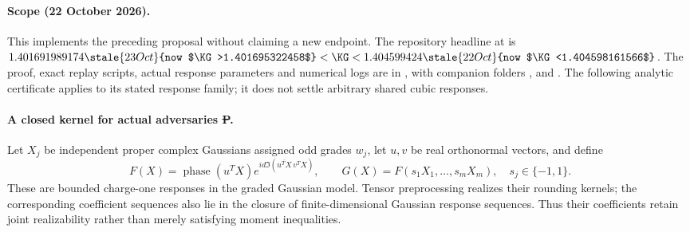\paragraph{Scope (22 October 2026).}
This implements the preceding proposal without claiming a new endpoint.
The repository headline at  is
$1.401691989174\stale{23 Oct}{now $\KG>1.401695322458$}<\KG<1.404599424\stale{22 Oct}{now $\KG<1.404598161566$}$.
The proof, exact replay scripts, actual response parameters and numerical
logs are in
,
with companion folders ,
 and
.
The following analytic certificate applies to its stated response family;
it does not settle arbitrary shared cubic responses.

\paragraph{A closed kernel for actual adversaries \st{P}.}
Let $X_j$ be independent proper complex Gaussians assigned odd grades
$w_j$, let $u,v$ be real orthonormal vectors, and define
\[
 F(X)=\operatorname{phase}(u^TX)
       e^{id\Im(\overline{u^TX}\,v^TX)},\qquad
 G(X)=F(s_1X_1,\ldots,s_mX_m),\quad s_j\in\{-1,1\}.
\]
These are bounded charge-one responses in the graded Gaussian model.
Tensor preprocessing realizes their rounding kernels; the corresponding
coefficient sequences also lie in the closure of finite-dimensional
Gaussian response sequences. Thus their coefficients retain joint
realizability rather than merely satisfying moment inequalities.

